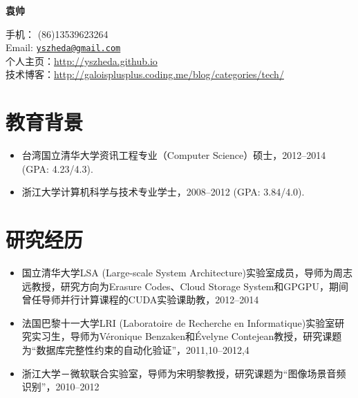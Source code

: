 \documentclass[letterpaper]{article}
\def\name{袁帅}
\begin{document}
\centerline{\huge\bf \name} \vspace{0.25in}
\begin{minipage}[t]{0.8\textwidth}
    手机： (86)13539623264   \\
    Email: \href{mailto:yszheda@gmail.com}{\tt yszheda@gmail.com} \\
    个人主页：\url{http://yszheda.github.io} \\
    技术博客：\url{http://galoisplusplus.coding.me/blog/categories/tech/}
\end{minipage}

\section*{教育背景}
\begin{itemize}
    \item 台湾国立清华大学资讯工程专业（Computer Science）硕士，2012--2014 (GPA: 4.23/4.3).
    \item 浙江大学计算机科学与技术专业学士，2008--2012 (GPA: 3.84/4.0).
\end{itemize}

\section*{研究经历}
\begin{itemize}
    \item 国立清华大学LSA (Large-scale System Architecture)实验室成员，导师为周志远教授，研究方向为Erasure Codes、Cloud Storage System和GPGPU，期间曾任导师并行计算课程的CUDA实验课助教，2012--2014
    \item 法国巴黎十一大学LRI (Laboratoire de Recherche en Informatique)实验室研究实习生，导师为V\'eronique Benzaken和\'Evelyne Contejean教授，研究课题为“数据库完整性约束的自动化验证”，2011,10--2012,4
    \item 浙江大学－微软联合实验室，导师为宋明黎教授，研究课题为“图像场景音频识别”，2010--2012
\end{itemize}
\end{document}
